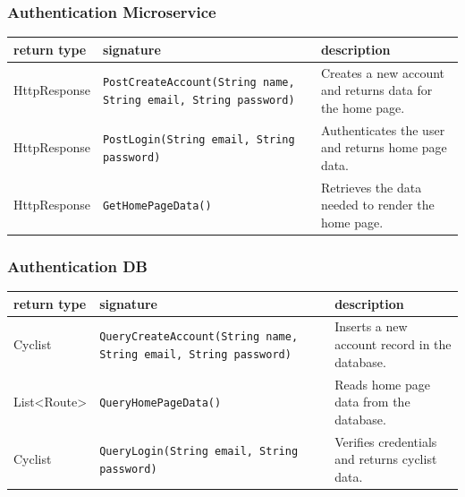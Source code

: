\subsubsection{Authentication Microservice}
\begin{table}[h]
\centering
\small
\begin{tabularx}{\textwidth}{|L{3cm}|L{6.5cm}|Y|}
\hline
\textbf{return type} & \textbf{signature} & \textbf{description} \\
\hline
HttpResponse & \texttt{PostCreateAccount(String name, String email, String password)} & Creates a new account and returns data for the home page. \\
\hline
HttpResponse & \texttt{PostLogin(String email, String password)} & Authenticates the user and returns home page data. \\
\hline
HttpResponse & \texttt{GetHomePageData()} & Retrieves the data needed to render the home page. \\
\hline
\end{tabularx}
\end{table}
\newpage
\subsubsection{Authentication DB}
\begin{table}[H]
\centering
\small
\begin{tabularx}{\textwidth}{|L{3cm}|L{6.5cm}|Y|}
\hline
\textbf{return type} & \textbf{signature} & \textbf{description} \\
\hline
Cyclist & \texttt{QueryCreateAccount(String name, String email, String password)} & Inserts a new account record in the database. \\
\hline
List<Route> & \texttt{QueryHomePageData()} & Reads home page data from the database. \\
\hline
Cyclist & \texttt{QueryLogin(String email, String password)} & Verifies credentials and returns cyclist data. \\
\hline
\end{tabularx}
\end{table}
